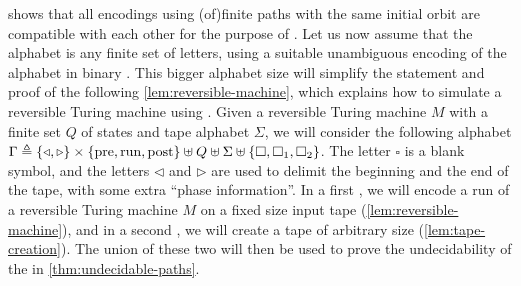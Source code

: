  shows that all encodings
using \kl(of){finite paths} with the same initial orbit are compatible with
each other for the purpose of . Let us now assume that
the alphabet is any finite set of letters, using a suitable unambiguous
encoding of the alphabet in binary \cite{BERST09}. This bigger alphabet size
will simplify the statement and proof of the following
\cref{lem:reversible-machine}, which explains how to simulate a
reversible Turing machine using . Given a reversible
Turing machine $M$ with a finite set $Q$ of states and tape alphabet $\Sigma$,
we will consider the following alphabet $\Gamma \triangleq \{  \triangleleft,
  \triangleright  \} \times \{  \text{pre}, \text{run}, \text{post}  \} \uplus Q
  \uplus \Sigma \uplus \{  \square, \square_1, \square_2 \}$. The letter
  $\square$ is a blank symbol, and the letters $\triangleleft$ and
  $\triangleright$ are used to delimit the beginning and the end of the tape,
  with some extra ``phase information''. In a first , we will encode a run of a reversible Turing machine $M$ on a fixed
  size input tape (\cref{lem:reversible-machine}), and in a second
  , we will create a tape of arbitrary size
  (\cref{lem:tape-creation}). The union of these two  will then be used to prove the undecidability of the
   in \cref{thm:undecidable-paths}.

